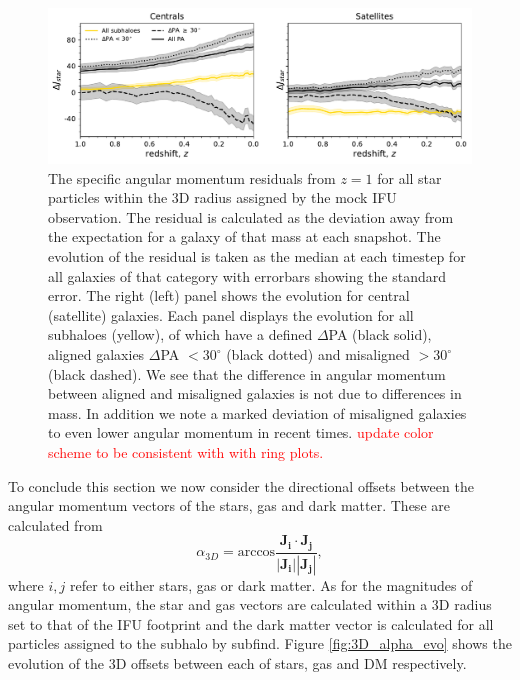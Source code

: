 \documentclass[fleqn,usenatbib]{mnras}
\newcommand{\red}[1]{{\textcolor{red}{#1}}}
\begin{document}
\begin{figure}
	\includegraphics[width=\linewidth]{tng_results/delta_j_stars_residuals.pdf}
    \caption{The specific angular momentum residuals from $z=1$ for all star particles within the 3D radius assigned by the mock IFU observation. The residual is calculated as the deviation away from the expectation for a galaxy of that mass at each snapshot. The evolution of the residual is taken as the median at each timestep for all galaxies of that category with errorbars showing the standard error. The right (left) panel shows the evolution for central (satellite) galaxies. Each panel displays the evolution for all subhaloes (yellow), of which have a defined $\Delta$PA (black solid), aligned galaxies $\Delta$PA $< 30^{\circ}$ (black dotted) and misaligned $> 30^{\circ}$ (black dashed). We see that the difference in angular momentum between aligned and misaligned galaxies is not due to differences in mass. In addition we note a marked deviation of misaligned galaxies to even lower angular momentum in recent times. \red{update color scheme to be consistent with with ring plots.}}
    \label{fig:sJ_evo_residual}
\end{figure}

To conclude this section we now consider the directional offsets between the angular momentum vectors of the stars, gas and dark matter. These are calculated from
\begin{equation} \label{eq:alpha}
    \alpha_{3D} = \text{arccos} \frac{\boldsymbol{J_{i}} \cdot \boldsymbol{J_{j}}}{\left| \boldsymbol{J_{i}} \right| \left| \boldsymbol{J_{j}} \right|},
\end{equation}
where $i, j$ refer to either stars, gas or dark matter. As for the magnitudes of angular momentum, the star and gas vectors are calculated within a 3D radius set to that of the IFU footprint and the dark matter vector is calculated for all particles assigned to the subhalo by subfind. Figure \ref{fig:3D_alpha_evo} shows the evolution of the 3D offsets between each of stars, gas and DM respectively. 
\end{document}
